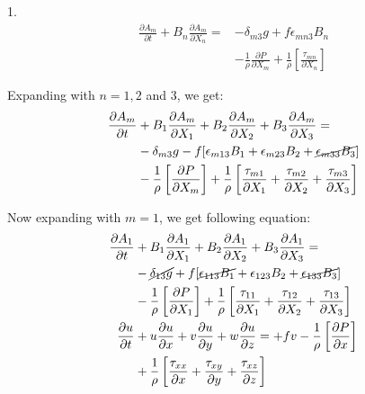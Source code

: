 \documentclass[fleqn,10pt]{SelfArx} %
\begin{document}
1. \vspace{-17pt}
\begin{align*}
	\frac{\partial A_m}{\partial t} + B_n\frac{\partial A_m}{\partial X_n} = & -\delta_{m3}g + f\epsilon_{mn3}B_n \\ & -\frac{1}{\rho}\frac{\partial P}{\partial X_m} + \frac{1}{\rho}\left[\frac{\tau_{mn}}{\partial X_n}\right]
\end{align*}

Expanding with $n=1,2$ and $3$, we get:
\begin{align*}
	\frac{\partial A_m}{\partial t} & + B_1\frac{\partial A_m}{\partial X_1} + B_2\frac{\partial A_m}{\partial X_2} + B_3\frac{\partial A_m}{\partial X_3} = \\  & -\delta_{m3}g - f[\epsilon_{m13}B_1 + \epsilon_{m23}B_2 + \cancel{\epsilon_{m33}B_3}] \\ & -\frac{1}{\rho}\left[\frac{\partial P}{\partial X_m}\right] + \frac{1}{\rho}\left[\frac{\tau_{m1}}{\partial X_1} + \frac{\tau_{m2}}{\partial X_2} + \frac{\tau_{m3}}{\partial X_3}\right]
\end{align*}

Now expanding with $m=1$, we get following equation:
\begin{align*}
	\frac{\partial A_1}{\partial t} & + B_1\frac{\partial A_1}{\partial X_1} + B_2\frac{\partial A_1}{\partial X_2} + B_3\frac{\partial A_1}{\partial X_3} =                                              \\  & -\cancel{\delta_{13}g} + f[\cancel{\epsilon_{113}B_1} + \epsilon_{123}B_2 + \cancel{\epsilon_{133}B_3}] \\ & -\frac{1}{\rho}\left[\frac{\partial P}{\partial X_1}\right] + \frac{1}{\rho}\left[\frac{\tau_{11}}{\partial X_1} + \frac{\tau_{12}}{\partial X_2} + \frac{\tau_{13}}{\partial X_3}\right] \\
	\frac{\partial u}{\partial t}   & + u\frac{\partial u}{\partial x} + v\frac{\partial u}{\partial y} + w\frac{\partial u}{\partial z} = +fv - \frac{1}{\rho}\left[\frac{\partial P}{\partial x}\right] \\ & + \frac{1}{\rho}\left[\frac{\tau_{xx}}{\partial x} + \frac{\tau_{xy}}{\partial y} + \frac{\tau_{xz}}{\partial z}\right]
\end{align*}
\end{document}
